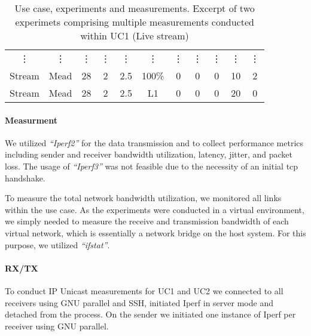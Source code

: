 \begin{table}[]
\begin{tabular}{@{}ccccccccccc@{}}
\vdots   & \vdots   & \vdots    & \vdots    & \vdots & \vdots & \vdots & \vdots    & \vdots    & \vdots          & \vdots \\[3pt]
Stream   & Mead     & 28        & 2         & 2.5    & 100\%  & 0      & 0         & 0         & 10              & 2          \\
Stream   & Mead     & 28        & 2         & 2.5    & L1     & 0      & 0         & 0         & 20              & 0          \\
\bottomrule
\end{tabular}
\caption[Use case, experiments and measurements]{
    Use case, experiments and measurements.
    Excerpt of two experimets comprising multiple measurements conducted within UC1 (Live stream)
}
\label{tab:usecase_experiment_measurement}
\end{table}


\paragraph{Measurment} %
\label{par:Measurment}

We utilized \textit{``Iperf2''} for the data transmission and to collect
    performance metrics including sender and receiver bandwidth utilization,
    latency, jitter, and packet loss.
The usage of \textit{``Iperf3''} was not feasible due to the necessity of an
    initial \gls{tcp} handshake.

To measure the total network bandwidth utilization, we monitored all links
    within the use case.
As the experiments were conducted in a virtual environment, we simply needed to
    measure the receive and transmission bandwidth of each virtual network,
    which is essentially a network bridge on the host system.
For this purpose, we utilized \textit{``ifstat''}.

\paragraph{RX/TX} %
\label{par:RX/TX}
To conduct IP Unicast measurements for UC1 and UC2 we connected to all
    receivers using GNU parallel and SSH, initiated Iperf in server mode and
    detached from the process.
On the sender we initiated one instance of Iperf per receiver using GNU
    parallel.

